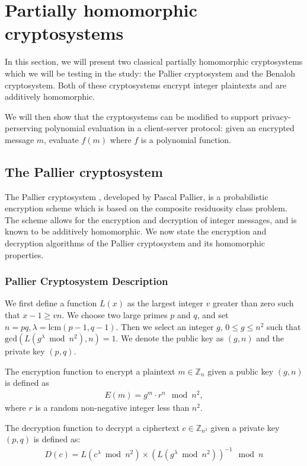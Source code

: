 \section{Partially homomorphic cryptosystems}

In this section, we will present two classical partially homomorphic cryptosystems which we will be testing in the study: the Pallier cryptosystem and the Benaloh cryptosystem. Both of these cryptosystems encrypt integer plaintexts and are additively homomorphic.

We will then show that the cryptosystems can be modified to support privacy-perserving polynomial evaluation in a client-server protocol: given an encrypted message $m$, evaluate $f(m)$ where $f$ is a polynomial function.

\subsection{The Pallier cryptosystem}
The Pallier cryptosystem \cite{stern_public-key_1999}, developed by Pascal Pallier, is a probabilistic encryption scheme which is based on the composite residuosity class problem. The scheme allows for the encryption and decryption of integer messages, and is known to be additively homomorphic. We now state the encryption and decryption algorithms of the Pallier cryptosystem and its homomorphic properties.

\subsubsection{Pallier Cryptosystem Description}
We first define a function $L(x)$ as the largest integer $v$ greater than zero such that $x-1 \geq vn$.
We choose two large primes $p$ and $q$, and set $n = pq, \lambda = \mathrm{lcm}(p-1,q-1)$.
Then we select an integer $g$, $0\leq g \leq n^2$ such that $\mathrm{gcd}(L(g^\lambda \bmod n^2), n) = 1$.
We denote the public key as $(g,n)$ and the private key $(p,q)$.

The encryption function to encrypt a plaintext $m \in \mathbb{Z}_n$ given a public key $(g,n)$ is defined as
\begin{align*}
  E(m) = g^m \cdot r^n \mod{n^2},
\end{align*}
where $r$ is a random non-negative integer less than $n^2$.

The decryption function to decrypt a ciphertext $c \in \mathbb{Z}_{n^2}$ given a private key $(p,q)$ is defined as:
\begin{align*}
  D(c) = L(c^\lambda \bmod n^2) \times (L(g^\lambda \bmod n^2))^{-1} \mod n
\end{align*}


